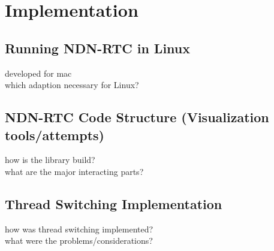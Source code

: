 \chapter{Implementation} \label{chapter:Implementation}


\section{Running NDN-RTC in Linux}
developed for mac \\
which adaption necessary for Linux?

\section{NDN-RTC Code Structure (Visualization tools/attempts)}
how is the library build? \\
what are the major interacting parts?

\section{Thread Switching Implementation}
how was thread switching implemented? \\
what were the problems/considerations?

